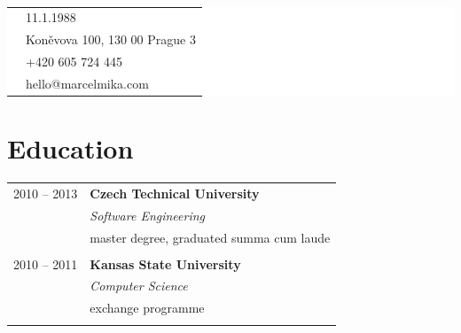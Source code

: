 \documentclass[10pt]{article} %
\begin{document}
\begin{minipage}[t]{0.5\textwidth}
\begin{minipage}[b]{0.30\textwidth}
\end{minipage}
\hspace{3pt}
\begin{minipage}{\textwidth} %
\raggedright
\mbox{}\\[-40pt]
\colorbox{white}{\textcolor{text1}{
\begin{tabular}{c|p{\textwidth}}
\raisebox{0pt}{\textborn} & 11.1.1988 \\ %
\raisebox{-1pt}{\textifsymbol{18}} & Koněvova 100, 130 00 Prague 3 \\ %
\raisebox{0pt}{\Telefon} & +420 605 724 445 \\ %
\raisebox{0pt}{\Letter} & hello@marcelmika.com \\ %
\end{tabular}
}}
\end{minipage}%


\hspace{5pt}
\section{Education} 
\medskip
\begin{tabular}{@{}rl@{}} 


\small\textsc{2010 -- 2013} & \large\textbf{Czech Technical University} \\ 
& \normalsize\textit{Software Engineering} \\ 
& \normalsize {master degree, graduated summa cum laude} \\ 
&\\


\small\textsc{2010 -- 2011} & \large\textbf{Kansas State University} \\ 
& \normalsize\textit{Computer Science} \\ 
& \normalsize {exchange programme} \\ 
&\\
	 

\end{tabular}
\end{minipage}
\end{document}
